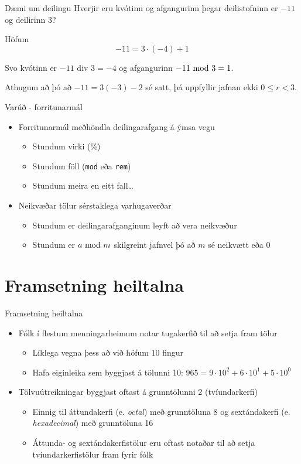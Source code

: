 \documentclass[handout]{beamer}
\begin{document}
\begin{frame}{Dæmi um deilingu}
Hverjir eru kvótinn og afgangurinn þegar deilistofninn er $-11$ og deilirinn $3$?\pause

Höfum
\[
 -11 = 3 \cdot (-4) + 1
\]

Svo kvótinn er $-11 \text{ div } 3 = -4$ og afgangurinn $-11 \ \text{mod}\ 3 = 1$.

\vspace{0.5cm}
Athugum að þó að $-11 = 3(-3) - 2$ sé satt, þá uppfyllir jafnan ekki $0 \leq r < 3$.
\end{frame}

\begin{frame}{Varúð - forritunarmál}
\begin{itemize}
 \item Forritunarmál meðhöndla deilingarafgang á ýmsa vegu
 \begin{itemize}
  \item Stundum virki (\%)
  \item Stundum föll (\texttt{mod} eða \texttt{rem})
  \item Stundum meira en eitt fall\ldots
 \end{itemize}
 \item Neikvæðar tölur sérstaklega varhugaverðar
 \begin{itemize}
  \item Stundum er deilingarafganginum leyft að vera neikvæður
  \item Stundum er $a \ \text{mod}\ m$ skilgreint jafnvel þó að $m$ sé neikvætt eða 0
 \end{itemize}
\end{itemize}
\end{frame}

\section{Framsetning heiltalna}

\begin{frame}{Framsetning heiltalna}
\begin{itemize}
 \item Fólk í flestum menningarheimum notar tugakerfið til að setja fram tölur
 \begin{itemize}
  \item Líklega vegna þess að við höfum 10 fingur
  \item Hafa eiginleika sem byggjast á tölunni 10: $965 = 9\cdot10^2+6\cdot10^1+5\cdot10^0$
 \end{itemize}
 \item Tölvuútreikningar byggjast oftast á grunntölunni 2 (tvíundarkerfi)
 \begin{itemize}
  \item Einnig til áttundakerfi (e. \emph{octal}) með grunntöluna 8 og sextándakerfi (e. \emph{hexadecimal}) með grunntöluna 16
  \item Áttunda- og sextándakerfistölur eru oftast notaðar til að setja tvíundarkerfistölur fram fyrir fólk
 \end{itemize}
\end{itemize}
\end{frame}
\end{document}
